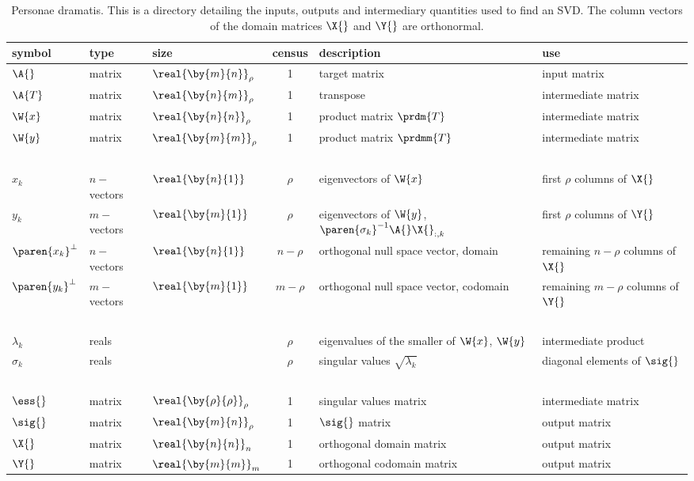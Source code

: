 \begin{landscape}
\begin{table}[p]
\begin{center}
\begin{tabular}{lllcll}
 symbol & type & size & census & description & use \\\hline
 $\A{}$  & matrix & $\real{\by{m}{n}}_{\rho}$ & 1 & target matrix  & input matrix \\
 $\A{T}$ & matrix & $\real{\by{n}{m}}_{\rho}$ & 1 & transpose & intermediate matrix\\ 
 $\W{x}$ & matrix & $\real{\by{n}{n}}_{\rho}$ & 1 & product matrix $\prdm{T}$ & intermediate matrix\\
 $\W{y}$ & matrix & $\real{\by{m}{m}}_{\rho}$ & 1 & product matrix $\prdmm{T}$ & intermediate matrix \\
 \ &&& \\
 $x_{k}$ & $n-$vectors & $\real{\by{n}{1}}$ & $\rho$ & eigenvectors of $\W{x}$ & first $\rho$ columns of $\X{}$ \\
 $y_{k}$ & $m-$vectors & $\real{\by{m}{1}}$ & $\rho$ & eigenvectors of $\W{y}$, $\paren{\sigma_{k}}^{-1}\A{}\X{}_{:,k}$ & first $\rho$ columns of $\Y{}$ \\
 $\paren{x_{k}}^{\perp}$ & $n-$vectors & $\real{\by{n}{1}}$ & $n-\rho$ & orthogonal null space vector, domain & remaining $n-\rho$ columns of $\X{}$ \\
 $\paren{y_{k}}^{\perp}$ & $m-$vectors & $\real{\by{m}{1}}$ & $m-\rho$ & orthogonal null space vector, codomain & remaining $m-\rho$ columns of $\Y{}$ \\
 \ &&& \\
 $\lambda_{k}$ & reals && $\rho$ & eigenvalues of the smaller of $\W{x}$, $\W{y}$ &intermediate product \\
 $\sigma_{k}$ & reals && $\rho$ & singular values $\sqrt{\lambda_{k}}$ & diagonal elements of $\sig{}$\\
 \ &&& \\
  $\ess{}$ & matrix & $\real{\by{\rho}{\rho}}_{\rho}$ & 1 & singular values matrix & intermediate matrix \\
  $\sig{}$ & matrix & $\real{\by{m}{n}}_{\rho}$ & 1 & $\sig{}$ matrix & output matrix \\
  $\X{}$ & matrix & $\real{\by{n}{n}}_{n}$ & 1 & orthogonal domain matrix & output matrix \\
  $\Y{}$ & matrix & $\real{\by{m}{m}}_{m}$ & 1 & orthogonal codomain matrix & output matrix \\
[10pt]
\end{tabular}
\end{center}
\label{tab:3:personaedramatis}
\caption[Personae dramatis]{Personae dramatis. This is a directory detailing the inputs, outputs and intermediary quantities used to find an SVD. The column vectors of the domain matrices $\X{}$ and $\Y{}$ are orthonormal.}
\end{table}


\end{landscape}
